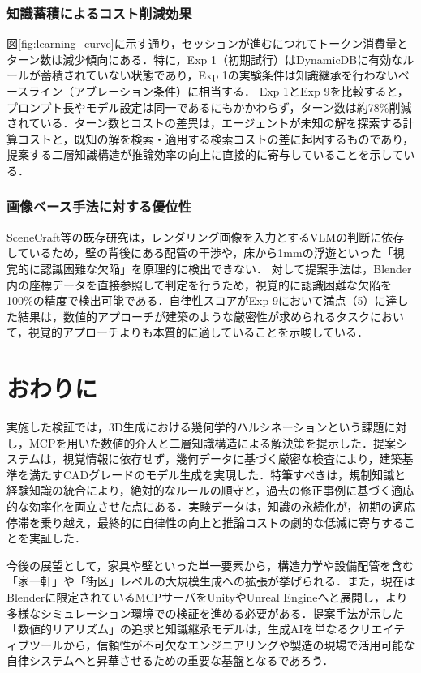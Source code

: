 \documentclass[dvipdfmx, a4paper, 9pt]{deimj}
\begin{document}
\subsubsection{知識蓄積によるコスト削減効果}
図\ref{fig:learning_curve}に示す通り，セッションが進むにつれてトークン消費量とターン数は減少傾向にある．特に，Exp 1（初期試行）はDynamicDBに有効なルールが蓄積されていない状態であり，Exp 1の実験条件は知識継承を行わないベースライン（アブレーション条件）に相当する．
Exp 1とExp 9を比較すると，プロンプト長やモデル設定は同一であるにもかかわらず，ターン数は約78\%削減されている．ターン数とコストの差異は，エージェントが未知の解を探索する計算コストと，既知の解を検索・適用する検索コストの差に起因するものであり，提案する二層知識構造が推論効率の向上に直接的に寄与していることを示している．

\subsubsection{画像ベース手法に対する優位性}
SceneCraft等の既存研究は，レンダリング画像を入力とするVLMの判断に依存しているため，壁の背後にある配管の干渉や，床から1mmの浮遊といった「視覚的に認識困難な欠陥」を原理的に検出できない．
対して提案手法は，Blender内の座標データを直接参照して判定を行うため，視覚的に認識困難な欠陥を100\%の精度で検出可能である．自律性スコアがExp 9において満点（5）に達した結果は，数値的アプローチが建築のような厳密性が求められるタスクにおいて，視覚的アプローチよりも本質的に適していることを示唆している．

\section{おわりに}

実施した検証では，3D生成における幾何学的ハルシネーションという課題に対し，MCPを用いた数値的介入と二層知識構造による解決策を提示した．提案システムは，視覚情報に依存せず，幾何データに基づく厳密な検査により，建築基準を満たすCADグレードのモデル生成を実現した．特筆すべきは，規制知識と経験知識の統合により，絶対的なルールの順守と，過去の修正事例に基づく適応的な効率化を両立させた点にある．実験データは，知識の永続化が，初期の適応停滞を乗り越え，最終的に自律性の向上と推論コストの劇的な低減に寄与することを実証した．

今後の展望として，家具や壁といった単一要素から，構造力学や設備配管を含む「家一軒」や「街区」レベルの大規模生成への拡張が挙げられる．また，現在はBlenderに限定されているMCPサーバをUnityやUnreal Engineへと展開し，より多様なシミュレーション環境での検証を進める必要がある．提案手法が示した「数値的リアリズム」の追求と知識継承モデルは，生成AIを単なるクリエイティブツールから，信頼性が不可欠なエンジニアリングや製造の現場で活用可能な自律システムへと昇華させるための重要な基盤となるであろう．




\end{document}
